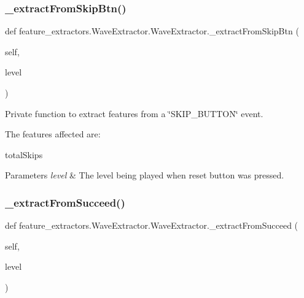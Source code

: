 \subsubsection{\texorpdfstring{\_extractFromSkipBtn()}{\_extractFromSkipBtn()}}
{\footnotesize\ttfamily def feature\+\_\+extractors.\+Wave\+Extractor.\+Wave\+Extractor.\+\_\+extract\+From\+Skip\+Btn (\begin{DoxyParamCaption}\item[{}]{self,  }\item[{}]{level }\end{DoxyParamCaption})\hspace{0.3cm}{\ttfamily [private]}}



Private function to extract features from a \char`\"{}\+S\+K\+I\+P\+\_\+\+B\+U\+T\+T\+O\+N\char`\"{} event. 

The features affected are\+:
\begin{DoxyItemize}
\item total\+Skips
\end{DoxyItemize}


\begin{DoxyParams}{Parameters}
{\em level} & The level being played when reset button was pressed. \\
\hline
\end{DoxyParams}
\mbox{\label{classfeature__extractors_1_1_wave_extractor_1_1_wave_extractor_a1ad2f370fc77ce5e9511733860df97eb}} 
\subsubsection{\texorpdfstring{\_extractFromSucceed()}{\_extractFromSucceed()}}
{\footnotesize\ttfamily def feature\+\_\+extractors.\+Wave\+Extractor.\+Wave\+Extractor.\+\_\+extract\+From\+Succeed (\begin{DoxyParamCaption}\item[{}]{self,  }\item[{}]{level }\end{DoxyParamCaption})\hspace{0.3cm}{\ttfamily [private]}}



